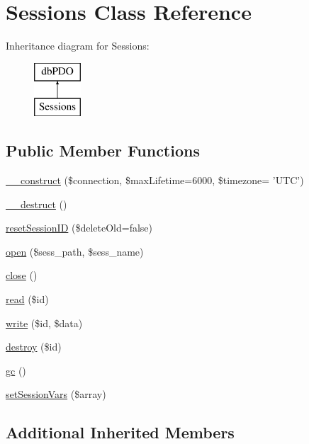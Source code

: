 \hypertarget{class_sessions}{\section{Sessions Class Reference}
\label{class_sessions}
}
Inheritance diagram for Sessions\-:\begin{figure}[H]
\begin{center}
\leavevmode
\includegraphics[height=2.000000cm]{class_sessions}
\end{center}
\end{figure}
\subsection*{Public Member Functions}
\begin{DoxyCompactItemize}
\item 
\hyperlink{class_sessions_a8cd53e3840b870683ec955ec89da3abe}{\-\_\-\-\_\-construct} (\$connection, \$max\-Lifetime=6000, \$timezone= 'U\-T\-C')
\item 
\hyperlink{class_sessions_a421831a265621325e1fdd19aace0c758}{\-\_\-\-\_\-destruct} ()
\item 
\hyperlink{class_sessions_a1d183070ef4f11c8899b6dcbed874f40}{reset\-Session\-I\-D} (\$delete\-Old=false)
\item 
\hyperlink{class_sessions_a9824b1cfea0c3b5874afd027c4812344}{open} (\$sess\-\_\-path, \$sess\-\_\-name)
\item 
\hyperlink{class_sessions_aa69c8bf1f1dcf4e72552efff1fe3e87e}{close} ()
\item 
\hyperlink{class_sessions_afa59bebedda70c37b94c2efc35da83f3}{read} (\$id)
\item 
\hyperlink{class_sessions_a5f277b5f0e4e2154cddc9a3a0d2bf57d}{write} (\$id, \$data)
\item 
\hyperlink{class_sessions_a726fa8a4b4b187b9ca32ba427aac8137}{destroy} (\$id)
\item 
\hyperlink{class_sessions_a14ff7ef4b198ff14884dd8c564264ca3}{gc} ()
\item 
\hyperlink{class_sessions_ae3ae7294fa85454de518e45e1c36fcf6}{set\-Session\-Vars} (\$array)
\end{DoxyCompactItemize}
\subsection*{Additional Inherited Members}


